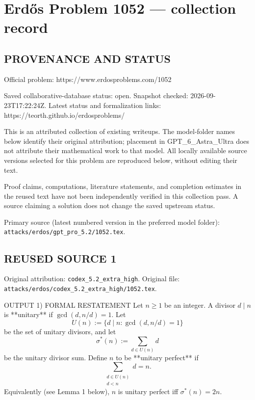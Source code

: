 \section*{Erd\H{o}s Problem 1052 --- collection record}

\subsection*{PROVENANCE AND STATUS}
Official problem: https://www.erdosproblems.com/1052

Saved collaborative-database status: open.
Snapshot checked: 2026-09-23T17:22:24Z.
Latest status and formalization links: https://teorth.github.io/erdosproblems/

This is an attributed collection of existing writeups. The model-folder names below identify their original attribution; placement in GPT\_6\_Astra\_Ultra does not attribute their mathematical work to that model. All locally available source versions selected for this problem are reproduced below, without editing their text.

Proof claims, computations, literature statements, and completion estimates in the reused text have not been independently verified in this collection pass. A source claiming a solution does not change the saved upstream status.

Primary source (latest numbered version in the preferred model folder): \texttt{attacks/erdos/gpt\_pro\_5.2/1052.tex}.

\subsection*{REUSED SOURCE 1}
Original attribution: \texttt{codex\_5.2\_extra\_high}.
Original file: \texttt{attacks/erdos/codex\_5.2\_extra\_high/1052.tex}.


OUTPUT
1) FORMAL RESTATEMENT
Let $n\ge 1$ be an integer. A divisor $d\mid n$ is **unitary** if $\gcd(d,n/d)=1$. Let
\[
U(n) := \{d \mid n : \gcd(d,n/d)=1\}
\]
be the set of unitary divisors, and let
\[
\sigma^*(n) := \sum_{d\in U(n)} d
\]
be the unitary divisor sum. Define $n$ to be **unitary perfect** if
\[
\sum_{\substack{d\in U(n) \\ d<n}} d = n.
\]
Equivalently (see Lemma 1 below), $n$ is unitary perfect iff $\sigma^*(n)=2n$.

